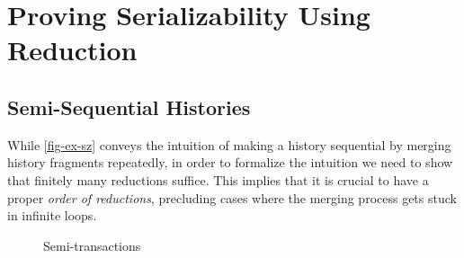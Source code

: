 \documentclass[sigplan,10pt,review,anonymous,screen]{acmart}\settopmatter{printfolios=true,printccs=false,printacmref=false}
\begin{document}




\clearpage
\appendix

\section{Proving Serializability Using Reduction}
\label{sec-appx-proof-sz}

\subsection{Semi-Sequential Histories}
\label{sec-appx-semi-sequential}

While \autoref{fig-ex-sz} conveys the intuition of making a history sequential by merging history fragments repeatedly, in order to formalize the intuition we need to show that finitely many reductions suffice.
This implies that it is crucial to have a proper \emph{order of reductions}, precluding cases where the merging process gets stuck in infinite loops.

\begin{figure}[h]
  \centering
  \caption{Semi-transactions}
  \label{fig-semi-trs}
\end{figure}
\end{document}
